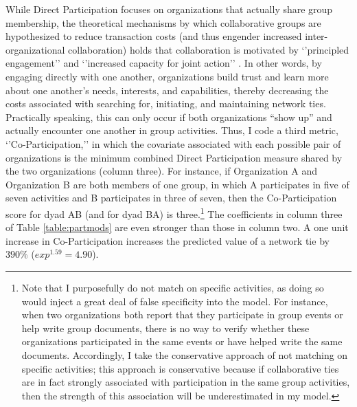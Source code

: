 \documentclass[12pt,a4paper,titlepage]{article}
\begin{document}
While Direct Participation focuses on organizations that actually share group membership, the theoretical mechanisms by which collaborative groups are hypothesized to reduce transaction costs (and thus engender increased inter-organizational collaboration) holds that collaboration is motivated by ‘’principled engagement’’ and ‘’increased capacity for joint action’’ \parencite{emerson2012}. In other words, by engaging directly with one another, organizations build trust and learn more about one another's needs, interests, and capabilities, thereby decreasing the costs associated with searching for, initiating, and maintaining network ties. Practically speaking, this can only occur if both organizations “show up” and actually encounter one another in group activities. Thus, I code a third metric, ‘’Co-Participation,’’ in which the covariate associated with each possible pair of organizations is the minimum combined Direct Participation measure shared by the two organizations (column three). For instance, if Organization A and Organization B are both members of one group, in which A participates in five of seven activities and B participates in three of seven, then the Co-Participation score for dyad AB (and for dyad BA) is three.\footnote{Note that I purposefully do not match on specific activities, as doing so would inject a great deal of false specificity into the model. For instance, when two organizations both report that they participate in group events or help write group documents, there is no way to verify whether these organizations participated in the same events or have helped write the same documents. Accordingly, I take the conservative approach of not matching on specific activities; this approach is conservative because if collaborative ties are in fact strongly associated with participation in the same group activities, then the strength of this association will be underestimated in my model.} The coefficients in column three of Table \ref{table:partmods} are even stronger than those in column two. A one unit increase in Co-Participation increases the predicted value of a network tie by $390\%$ ($exp^{1.59} = 4.90$).
\end{document}
